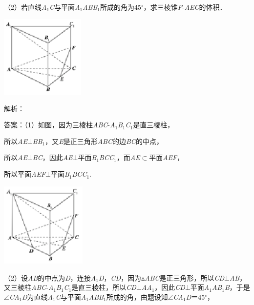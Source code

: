 \documentclass{article} %
\begin{document}
（2）若直线\textit{A}${}_{1}$\textit{C}与平面\textit{A}${}_{1}$\textit{ABB}${}_{1}$所成的角为45$\mathrm{{}^\circ}$，求三棱锥\textit{F}-\textit{AEC}的体积．

\includegraphics*[width=1.65in, height=1.62in, keepaspectratio=false]{image226}

解析：

答案：（1）如图，因为三棱柱\textit{ABC}-\textit{A}${}_{1}$\textit{B}${}_{1}$\textit{C}${}_{1}$是直三棱柱，

所以\textit{AE}$\mathrm{\bot}$\textit{BB}${}_{1}$，又\textit{E}是正三角形\textit{ABC}的边\textit{BC}的中点，

所以\textit{AE}$\mathrm{\bot}$\textit{BC}，因此\textit{AE}$\mathrm{\bot}$平面\textit{B}${}_{1}$\textit{BCC}${}_{1}$，而\textit{AE}$\mathrm{\subset }$平面\textit{AEF}，

所以平面\textit{AEF}$\mathrm{\bot}$平面\textit{B}${}_{1}$\textit{BCC}${}_{1}$.

\includegraphics*[width=1.68in, height=1.67in, keepaspectratio=false]{image227}

（2）设\textit{AB}的中点为\textit{D}，连接\textit{A}${}_{1}$\textit{D}，\textit{CD}，因为$\mathrm{\vartriangle}$\textit{ABC}是正三角形，所以\textit{CD}$\mathrm{\bot}$\textit{AB}，又三棱柱\textit{ABC}-\textit{A}${}_{1}$\textit{B}${}_{1}$\textit{C}${}_{1}$是直三棱柱，所以\textit{CD}$\mathrm{\bot}$\textit{AA}${}_{1}$，因此\textit{CD}$\mathrm{\bot}$平面\textit{A}${}_{1}$\textit{AB}${}_{1}$\textit{B}，于是$\mathrm{\angle}$\textit{CA}${}_{1}$\textit{D}为直线\textit{A}${}_{1}$\textit{C}与平面\textit{A}${}_{1}$\textit{ABB}${}_{1}$所成的角，由题设知$\mathrm{\angle}$\textit{CA}${}_{1}$\textit{D}＝45$\mathrm{{}^\circ}$，
\end{document}
